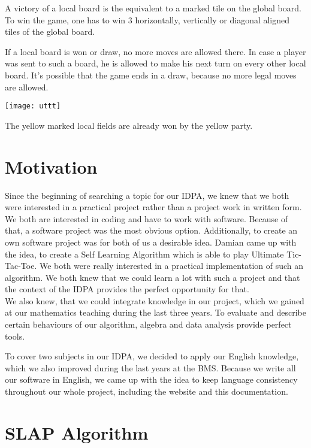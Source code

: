 A victory of a local board is the equivalent to a marked tile on the global board. To win the game, one has to win 3 horizontally, vertically or diagonal aligned tiles of the global board.

If a local board is won or draw, no more moves are allowed there. In case a player was sent to such a board, he is allowed to make his next turn on every other local board. It's possible that the game ends in a draw, because  no more legal moves are allowed.

\begin{fixedpic}
	\centering
	\texttt{[image: uttt]}
\end{fixedpic}

The yellow marked local fields are already won by the yellow party.

\section{Motivation}
Since the beginning of searching a topic for our IDPA, we knew that we both were interested in a practical project rather than a  project work in written form. We both are interested in coding and have to work with software. Because of that, a software project was the most obvious option. Additionally, to create an own software project was for both of us a desirable idea.
Damian came up with the idea, to create a Self Learning Algorithm which is able to play Ultimate Tic-Tac-Toe. We both were really interested in a practical implementation of such an algorithm. We both knew that we could learn a lot with such a project and that the context of the IDPA provides the perfect opportunity for that. \\

We also knew, that we could integrate knowledge in our project, which we gained at our mathematics teaching during the last three years. To evaluate and describe certain behaviours of our algorithm, algebra and data analysis provide perfect tools.

To cover two subjects in our IDPA, we decided to apply our English knowledge, which we also improved during the last years at the BMS. Because we write all our software in English, we came up with the idea to keep language consistency throughout our whole project, including the website and this documentation.

\section{SLAP Algorithm}

